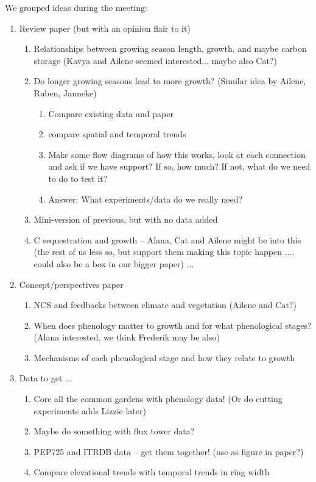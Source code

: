 \documentclass[11pt,letter]{article}
\begin{document}
We grouped ideas during the meeting:
\begin{enumerate}
\item Review paper (but with an opinion flair to it)
\begin{enumerate}
\item Relationships between growing season length, growth, and maybe carbon storage (Kavya and Ailene seemed interested... maybe also Cat?)
\item Do longer growing seasons lead to more growth? (Similar idea by Ailene, Ruben, Janneke)
\begin{enumerate}
\item Compare existing data and paper
\item compare spatial and temporal trends
\item Make some flow diagrams of how this works, look at each connection and ask if we have support? If so, how much? If not, what do we need to do to test it?
\item Answer: What experiments/data do we really need?
\end{enumerate}
\item Mini-version of previous, but with no data added
\item C sequestration and growth -- Alana, Cat and Ailene might be into this (the rest of us less so, but support them making this topic happen .... could also be a box in our bigger paper) ... 
\end{enumerate}
\item Concept/perspectives paper
\begin{enumerate}
\item NCS and feedbacks between climate and vegetation (Ailene and Cat?)
\item When does phenology matter to growth and for what phenological stages? (Alana interested, we think Frederik may be also)
\item Mechanisms of each phenological stage and how they relate to growth
\end{enumerate}
\item Data to get ...
\begin{enumerate}
\item Core all the common gardens with phenology data! (Or do cutting experiments adds Lizzie later)
\item Maybe do something with flux tower data?
\item PEP725 and ITRDB data -- get them together! (use as figure in paper?)
\item Compare elevational trends with temporal trends in ring width

\end{enumerate}
\end{enumerate}
\end{document}
